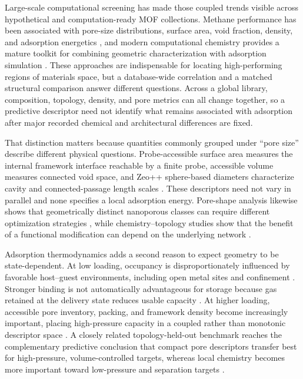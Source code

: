 \documentclass[11pt,a4paper]{article}
\begin{document}
Large-scale computational screening has made those coupled trends visible across
hypothetical and computation-ready MOF collections. Methane performance has been
associated with pore-size distributions, surface area, void fraction, density, and
adsorption energetics
\cite{wilmer2012screening,fernandez2013qspr,chung2014core,lee2021trillions}, and
modern computational chemistry provides a mature toolkit for combining geometric
characterization with adsorption simulation \cite{coudert2016computational}. These
approaches are indispensable for locating high-performing regions of materials
space, but a database-wide correlation and a matched structural comparison answer
different questions. Across a global library, composition, topology, density, and
pore metrics can all change together, so a predictive descriptor need not identify
what remains associated with adsorption after major recorded chemical and
architectural differences are fixed.

That distinction matters because quantities commonly grouped under ``pore size''
describe different physical questions. Probe-accessible surface area measures the
internal framework interface reachable by a finite probe, accessible volume
measures connected void space, and Zeo++ sphere-based diameters characterize cavity
and connected-passage length scales \cite{duren2007surface,willems2012zeopp}.
These descriptors need not vary in parallel and none specifies a local adsorption
energy. Pore-shape analysis likewise shows that geometrically distinct nanoporous
classes can require different optimization strategies
\cite{lee2017poregeometry}, while chemistry--topology studies show that the benefit
of a functional modification can depend on the underlying network
\cite{anderson2018poretopology}.

Adsorption thermodynamics adds a second reason to expect geometry to be
state-dependent. At low loading, occupancy is disproportionately influenced by
favorable host--guest environments, including open metal sites and confinement
\cite{wu2009opensites,getman2012simreview}. Stronger binding is not automatically
advantageous for storage because gas retained at the delivery state reduces usable
capacity \cite{rana2014metal,lee2014doe}. At higher loading, accessible pore
inventory, packing, and framework density become increasingly important, placing
high-pressure capacity in a coupled rather than monotonic descriptor space
\cite{peng2013methane,gomezgualdron2014limits,ahmed2024methaneML,
song2026poreengineering}. A closely related topology-held-out benchmark reaches
the complementary predictive conclusion that compact pore descriptors transfer
best for high-pressure, volume-controlled targets, whereas local chemistry becomes
more important toward low-pressure and separation targets
\cite{alimardani2026descriptoradequacy}.
\end{document}
